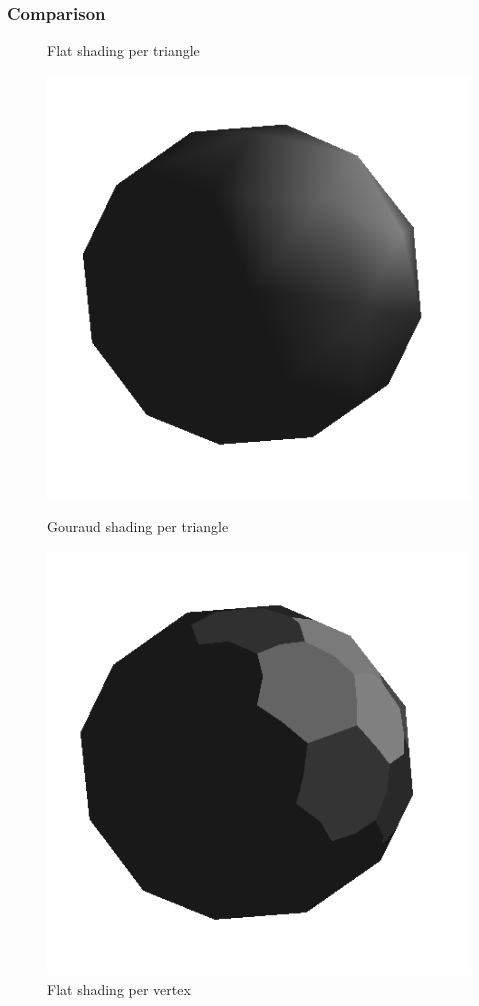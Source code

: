 \subsubsection{Comparison}
\color{red}{TODO: add armadillo, horse, etc. images with these 3 effects (flat shading 1 and 2, gouraud shading)}
\color{black} %
\begin{figure}[!h]
    \centering
    \centering
    \caption{Flat shading per triangle}\label{fig:flat-shading-triangle}
    \endminipage\hfill
    \centering
    \includegraphics[scale=0.5]{images/gouraudshading.png}
    \caption{Gouraud shading per triangle}\label{fig:gouraud-shading}
    \endminipage\hfill
    \centering
    \includegraphics[scale=0.5]{images/extentflatshading.png}
    \caption{Flat shading per vertex}\label{fig:flat-shading-vertex}
    \endminipage
\end{figure}


